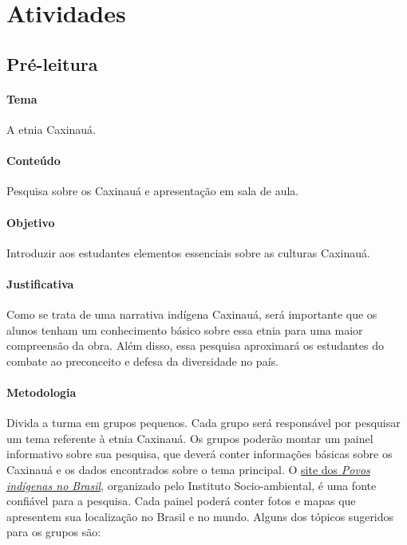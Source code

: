 \documentclass[11pt]{extarticle}
\begin{document}
\section{Atividades}

\subsection{Pré-leitura}


\paragraph{Tema} A etnia Caxinauá.

\paragraph{Conteúdo} Pesquisa sobre os Caxinauá e apresentação em sala de aula.

\paragraph{Objetivo} Introduzir aos estudantes elementos essenciais sobre as culturas Caxinauá.

\paragraph{Justificativa} Como se trata de uma narrativa indígena Caxinauá, será importante que os alunos tenham um conhecimento básico sobre essa etnia para uma maior compreensão da obra. Além disso, essa pesquisa aproximará os estudantes do combate ao preconceito e defesa da diversidade no país.


\paragraph{Metodologia} Divida a turma em grupos pequenos. Cada grupo será responsável por pesquisar um tema referente à etnia Caxinauá. Os grupos poderão montar um painel informativo sobre sua pesquisa, que deverá conter informações básicas sobre os Caxinauá e os dados encontrados sobre o tema principal. O \href{https://pib.socioambiental.org/pt/Povo:Huni_Kuin_(Kaxinaw\%C3\%A1)}{site dos \textit{Povos indígenas no Brasil}}, organizado pelo Instituto Socio-ambiental, é uma fonte confiável para a pesquisa. Cada painel poderá conter fotos e mapas que apresentem sua localização no Brasil e no mundo. Alguns dos tópicos sugeridos para os grupos são:
\end{document}
